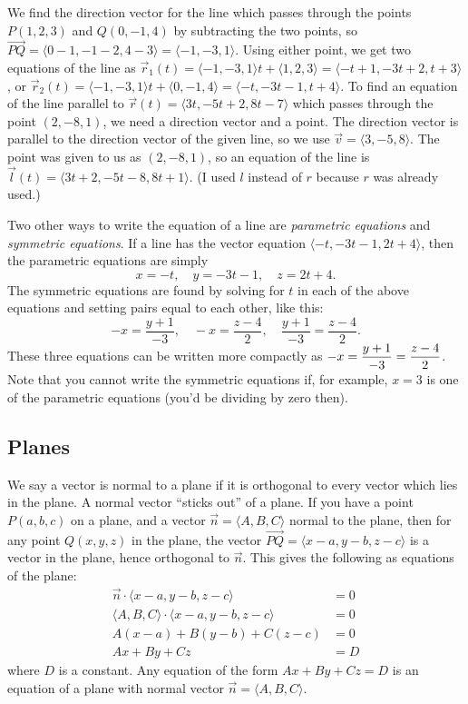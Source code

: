 We find the direction vector for the line which passes through the
points $P(1,2,3)$ and $Q(0,-1,4)$ by subtracting the two points, so
$\vec{PQ} = \langle0-1,-1-2,4-3\rangle = \langle-1,-3,1\rangle$. Using
either point, we get two equations of the line as $\vec r_1(t) =
\langle-1,-3,1\rangle t+ \langle1,2,3\rangle =
\langle-t+1,-3t+2,t+3\rangle$, or $\vec r_2(t) = \langle-1,-3,1\rangle
t+ \langle0,-1,4\rangle = \langle-t,-3t-1,t+4\rangle$.  
To find an equation of the line parallel to $\vec r(t) =
\langle3t,-5t+2,8t-7\rangle$ which passes through the point $(2,-8,1)$,
we need a direction vector and a point.  The direction vector is
parallel to the direction vector of the given line, so we use $\vec v
= \langle3,-5,8\rangle$. The point was given to us as $(2,-8,1)$, so an
equation of the line is $\vec l (t) = \langle3t+2,-5t-8,8t+1\rangle$. 
(I used $l$ instead of $r$ because $r$ was already used.)
 
Two other ways to write the equation of a line are \emph{parametric
  equations} and \emph{symmetric equations}.  If a line has the vector
equation $\langle-t, -3t-1,2t+4\rangle$, then the parametric equations are simply
\begin{equation*}
  x=-t, \quad y=-3t-1, \quad z=2t+4.
\end{equation*}
The symmetric equations are found by solving for $t$ in each of the
above equations and setting pairs equal to each other, like this:
\begin{equation*}
  -x=\frac {y+1}{-3},\quad -x=\frac {z-4}{2}, \quad \frac{y+1}{-3}=\frac{z-4}{2}.
\end{equation*}
These three equations can be written more compactly as $\displaystyle
  -x=\frac {y+1}{-3}=\frac {z-4}{2}$.
Note that you cannot write the symmetric equations if, for example,
$x=3$ is one of the parametric equations (you'd be dividing by zero then).

\subsection{Planes}

We say a vector is normal to a plane if it is orthogonal to every
vector which lies in the plane.  A normal vector ``sticks out'' of a
plane. If you have a point {$P(a,b,c)$} on a plane, and  a vector
{$\vec n = \langle A,B,C\rangle$} normal to the plane, then for any
point $Q(x,y,z)$ in the plane, the vector
$\vec{PQ}=\langle x-a,y-b,z-c\rangle$ is a vector in the plane, hence
orthogonal to $\vec n$. This gives the following as equations of the
plane: 
$$
\begin{array}{rl}\vec n \cdot \langle x-a,y-b,z-c\rangle &= 0\\
\langle A,B,C\rangle \cdot \langle x-a,y-b,z-c\rangle &= 0\\
A(x-a)+B(y-b)+C(z-c)&= 0\\
Ax+By+Cz&= D
\end{array}$$
where $D$ is a constant.  Any equation of the form $Ax+By+Cz= D$ is an
equation of a plane with normal vector {$\vec n =
\langle A,B,C\rangle$}. 

